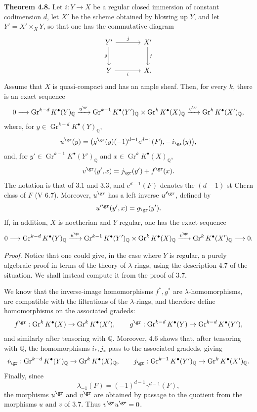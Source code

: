 \documentclass[11pt]{article}
\begin{document}
\textbf{Theorem 4.8.} Let \(i:Y\to X\) be a regular closed immersion of constant codimension \(d\), let \(X'\) be the scheme obtained by blowing up \(Y\), and let \(Y'=X'\times_XY\), so that one has the commutative diagram
\[
\begin{tikzcd}[column sep=large,row sep=large]
Y' \arrow[r,"j"] \arrow[d,"g"'] & X' \arrow[d,"f"]\\
Y \arrow[r,"i"'] & X.
\end{tikzcd}
\]
Assume that \(X\) is quasi-compact and has an ample sheaf. Then, for every \(k\), there is an exact sequence
\[
0\longrightarrow
\operatorname{Gr}^{k-d}K^\bullet(Y)_{\mathbb Q}
\xrightarrow{u^{\gr}}
\operatorname{Gr}^{k-1}K^\bullet(Y')_{\mathbb Q}
\times
\operatorname{Gr}^{k}K^\bullet(X)_{\mathbb Q}
\xrightarrow{v^{\gr}}
\operatorname{Gr}^{k}K^\bullet(X')_{\mathbb Q},
\]
where, for \(y\in \operatorname{Gr}^{k-d}K^\bullet(Y)_{\mathbb Q}\),
\[
  u^{\gr}(y)=
  \bigl(g^{\gr}(y)(-1)^{d-1}c^{d-1}(F),-\,i_{\gr}(y)\bigr),
\]
and, for \(y'\in \operatorname{Gr}^{k-1}K^\bullet(Y')_{\mathbb Q}\) and \(x\in \operatorname{Gr}^{k}K^\bullet(X)_{\mathbb Q}\),
\[
  v^{\gr}(y',x)=j_{\gr}(y')+f^{\gr}(x).
\]
The notation is that of 3.1 and 3.3, and \(c^{d-1}(F)\) denotes the \((d-1)\)-st Chern class of \(F\) (V 6.7). Moreover, \(u^{\gr}\) has a left inverse \(u'^{\gr}\), defined by
\[
  u'^{\gr}(y',x)=g_{\gr}(y').
\]
If, in addition, \(X\) is noetherian and \(Y\) regular, one has the exact sequence
\[
0\longrightarrow
\operatorname{Gr}^{k-d}K^\bullet(Y)_{\mathbb Q}
\xrightarrow{u^{\gr}}
\operatorname{Gr}^{k-1}K^\bullet(Y')_{\mathbb Q}
\times
\operatorname{Gr}^{k}K^\bullet(X)_{\mathbb Q}
\xrightarrow{v^{\gr}}
\operatorname{Gr}^{k}K^\bullet(X')_{\mathbb Q}
\longrightarrow0.
\]

\emph{Proof.} Notice that one could give, in the case where \(Y\) is regular, a purely algebraic proof in terms of the theory of \(\lambda\)-rings, using the description 4.7 of the situation. We shall instead compute it from the proof of 3.7.

We know that the inverse-image homomorphisms \(f^*,g^*\) are \(\lambda\)-homomorphisms, are compatible with the filtrations of the \(\lambda\)-rings, and therefore define homomorphisms on the associated gradeds:
\[
  f^{\gr}:\operatorname{Gr}^kK^\bullet(X)\to\operatorname{Gr}^kK^\bullet(X'),
  \qquad
  g^{\gr}:\operatorname{Gr}^{k-d}K^\bullet(Y)\to\operatorname{Gr}^{k-d}K^\bullet(Y'),
\]
and similarly after tensoring with \(\mathbb Q\). Moreover, 4.6 shows that, after tensoring with \(\mathbb Q\), the homomorphisms \(i_*,j_*\) pass to the associated gradeds, giving
\[
  i_{\gr}:\operatorname{Gr}^{k-d}K^\bullet(Y)_{\mathbb Q}
  \to \operatorname{Gr}^{k}K^\bullet(X)_{\mathbb Q},
  \qquad
  j_{\gr}:\operatorname{Gr}^{k-1}K^\bullet(Y')_{\mathbb Q}
  \to \operatorname{Gr}^{k}K^\bullet(X')_{\mathbb Q}.
\]
Finally, since
\[
  \lambda_{-1}(F)=(-1)^{d-1}\gamma^{d-1}(F),
\]
the morphisms \(u^{\gr}\) and \(v^{\gr}\) are obtained by passage to the quotient from the morphisms \(u\) and \(v\) of 3.7. Thus \(v^{\gr}u^{\gr}=0\).
\end{document}
